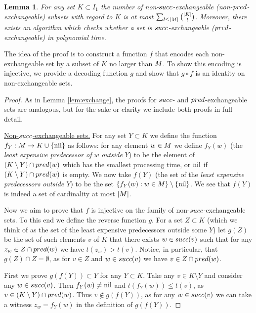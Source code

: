\documentclass{article}
\newtheorem{lemma}[theorem]{Lemma}
\theoremstyle{definition}
\begin{document}
\begin{lemma} \label{lem:core}
For any set $K \subset I_1$ the number of non-${succ}$-exchangeable (non-${pred}$-exchangeable) subsets with regard to $K$ is at most $\sum_{l \leq |M|} \binom{|K|}{l}$.
Moreover, there exists an algorithm
which checks whether a set is ${succ}$-exchangeable (${pred}$-exchangeable) in polynomial
time.
\end{lemma}

The idea of the proof is to construct a function $f$ that encodes each non-exchangeable set
by a subset of $K$ no larger than $M$.
To show this encoding is injective, we provide a decoding function $g$ and show that
$g\circ f$ is an identity on non-exchangeable sets.

\begin{proof}
As in Lemma \ref{lem:exchange}, the proofs for ${succ}$- and ${pred}$-exchangeable sets are analogous,
but for the sake or clarity we include both proofs in full detail.

{\underline{Non-${succ}$-exchangeable sets.}} 
For any set $Y \subset K$ we define the function 
$f_Y : M \to K \cup \{\textrm{nil}\}$ as follows:
for any element $w \in M$ we define $f_Y(w)$ 
(the {\em least expensive predecessor of} $w$ {\em outside} $Y$) to be the element of
$(K \setminus Y) \cap {\ensuremath{pred}}(w)$ which has the smallest processing time,
or $\textrm{nil}$ if $(K \setminus Y) \cap {\ensuremath{pred}}(w)$ is empty.
We now take $f(Y)$ (the set of the {\em least expensive predecessors outside $Y$})
to be the set $\{f_Y(w) : w \in M\} \setminus \{\textrm{nil}\}$.
We see that $f(Y)$ is indeed a set of cardinality at most $|M|$.

Now we aim to prove that
$f$ is injective on the family of non-${succ}$-exchangeable sets.
To this end we define the reverse function $g$. For a set $Z \subset K$
(which we think of as the set of the least expensive predecessors outside some $Y$)
let $g(Z)$ be the set of such elements $v$ of $K$
that there exists $w \in {\ensuremath{succ}}(v)$ such that for any $z_w \in Z \cap {\ensuremath{pred}}(w)$ we have
$t(z_w) > t(v)$. 
Notice, in particular, that $g(Z) \cap Z = \emptyset$, as for $v \in Z$ and $w \in {\ensuremath{succ}}(v)$ we have $v \in Z \cap {\ensuremath{pred}}(w)$.

First we prove $g(f(Y)) \subset Y$ for any $Y \subset K$.
Take any $v \in K \setminus Y$ and consider any $w \in {\ensuremath{succ}}(v)$.
Then $f_Y(w) \neq \textrm{nil}$  and $t(f_Y(w)) \leq t(v)$,
as $v \in (K \setminus Y) \cap {\ensuremath{pred}}(w)$.
Thus $v \notin g(f(Y))$, as for any $w \in {\ensuremath{succ}}(v)$ we can take a witness $z_w = f_Y(w)$
in the definition of $g(f(Y))$.


\end{proof}
\end{document}
